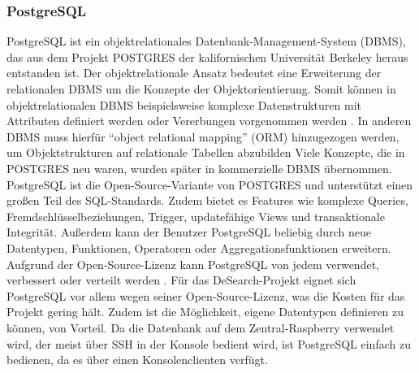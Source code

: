 \subsubsection{PostgreSQL}
PostgreSQL ist ein objektrelationales Datenbank-Management-System (DBMS), das aus dem Projekt POSTGRES der kalifornischen Universität Berkeley heraus entstanden ist. Der objektrelationale Ansatz bedeutet eine Erweiterung der relationalen DBMS um die Konzepte der Objektorientierung. Somit können in objektrelationalen DBMS beispielsweise komplexe Datenstrukturen mit Attributen definiert werden oder Vererbungen vorgenommen werden \citep[Vgl.][S. 135f.]{datenbanken}. In anderen DBMS muss hierfür \enquote{object relational mapping} (ORM) hinzugezogen werden, um Objektstrukturen auf relationale Tabellen abzubilden \citep[Vgl.][S. 426]{balzert} Viele Konzepte, die in POSTGRES neu waren, wurden später in kommerzielle DBMS übernommen. PostgreSQL ist die Open-Source-Variante von POSTGRES und unterstützt einen großen Teil des SQL-Standards. Zudem bietet es Features wie komplexe Queries, Fremdschlüsselbeziehungen, Trigger, updatefähige Views und transaktionale Integrität. Außerdem kann der Benutzer PostgreSQL beliebig durch neue Datentypen, Funktionen, Operatoren oder Aggregationsfunktionen erweitern. Aufgrund der Open-Source-Lizenz kann PostgreSQL von jedem verwendet, verbessert oder verteilt werden
\citep[Vgl.][preface, S. lxvi]{postgres}. Für das DeSearch-Projekt eignet sich PostgreSQL vor allem wegen seiner Open-Source-Lizenz, was die Kosten für das Projekt gering hält. Zudem ist die Möglichkeit, eigene Datentypen definieren zu können, von Vorteil. Da die Datenbank auf dem Zentral-Raspberry verwendet wird, der meist über SSH in der Konsole bedient wird, ist PostgreSQL einfach zu bedienen, da es über einen Konsolenclienten verfügt.

